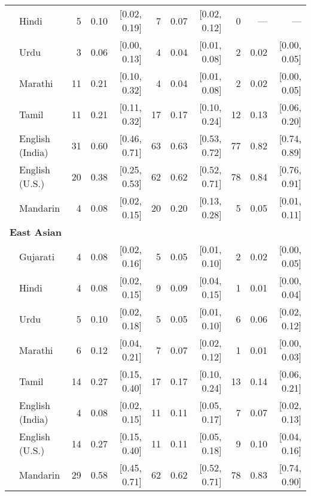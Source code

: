 \begin{table}[t]
\begin{footnotesize}
\begin{tabular}{p{.1in}lrrrrrrrrr}
 & Hindi & 5 & 0.10 & [0.02, 0.19] & 7 & 0.07 & [0.02, 0.12] & 0 & --- & ---\\

 & Urdu & 3 & 0.06 & [0.00, 0.13] & 4 & 0.04 & [0.01, 0.08] & 2 & 0.02 & [0.00, 0.05]\\

 & Marathi & 11 & 0.21 & [0.10, 0.32] & 4 & 0.04 & [0.01, 0.08] & 2 & 0.02 & [0.00, 0.05]\\

 & Tamil & 11 & 0.21 & [0.11, 0.32] & 17 & 0.17 & [0.10, 0.24] & 12 & 0.13 & [0.06, 0.20]\\

 & English (India) & 31 & 0.60 & [0.46, 0.71] & 63 & 0.63 & [0.53, 0.72] & 77 & 0.82 & [0.74, 0.89]\\

 & English (U.S.) & 20 & 0.38 & [0.25, 0.53] & 62 & 0.62 & [0.52, 0.71] & 78 & 0.84 & [0.76, 0.91]\\

& Mandarin & 4 & 0.08 & [0.02, 0.15] & 20 & 0.20 & [0.13, 0.28] & 5 & 0.05 & [0.01, 0.11]\\
\midrule
\multicolumn{11}{l}{\textbf{East Asian}}\\
& Gujarati & 4 & 0.08 & [0.02, 0.16] & 5 & 0.05 & [0.01, 0.10] & 2 & 0.02 & [0.00, 0.05]\\

 & Hindi & 4 & 0.08 & [0.02, 0.15] & 9 & 0.09 & [0.04, 0.15] & 1 & 0.01 & [0.00, 0.04]\\

 & Urdu & 5 & 0.10 & [0.02, 0.18] & 5 & 0.05 & [0.01, 0.10] & 6 & 0.06 & [0.02, 0.12]\\

 & Marathi & 6 & 0.12 & [0.04, 0.21] & 7 & 0.07 & [0.02, 0.12] & 1 & 0.01 & [0.00, 0.03]\\

 & Tamil & 14 & 0.27 & [0.15, 0.40] & 17 & 0.17 & [0.10, 0.24] & 13 & 0.14 & [0.06, 0.21]\\

 & English (India) & 4 & 0.08 & [0.02, 0.15] & 11 & 0.11 & [0.05, 0.17] & 7 & 0.07 & [0.02, 0.13]\\

 & English (U.S.) & 14 & 0.27 & [0.15, 0.40] & 11 & 0.11 & [0.05, 0.18] & 9 & 0.10 & [0.04, 0.16]\\

& Mandarin & 29 & 0.58 & [0.45, 0.71] & 62 & 0.62 & [0.52, 0.71] & 78 & 0.83 & [0.74, 0.90]\\
\bottomrule
\end{tabular}
\end{footnotesize}
\end{table}